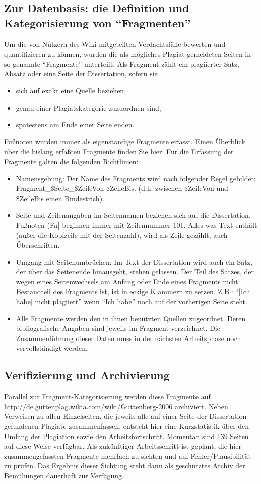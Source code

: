 \documentclass[ngerman,final,fontsize=12pt,paper=a4,twoside,BCOR=8mm,draft=false]{scrartcl}
\begin{document}
\subsection{Zur Datenbasis: die Definition und Kategorisierung von "`Fragmenten"'}
Um die von Nutzern des Wiki mitgeteilten Verdachtsfälle bewerten und quantifizieren zu können, wurden die als mögliches Plagiat gemeldeten Seiten in so genannte "`Fragmente"' unterteilt. Als Fragment zählt ein plagiierter Satz, Absatz oder eine Seite der Dissertation, sofern sie
\begin{itemize}
\item sich auf exakt eine Quelle beziehen,
\item genau einer Plagiatskategorie zuzuordnen sind,
\item spätestens am Ende einer Seite enden.
\end{itemize}
Fußnoten wurden immer als eigenständige Fragmente erfasst. Einen Überblick über die bislang erfaßten Fragmente finden Sie hier. 
Für die Erfassung der Fragmente galten die folgenden Richtlinien: 
\begin{itemize}
\item Namensgebung: Der Name des Fragments wird nach folgender Regel gebildet: Fragment\_\$Seite\_\$ZeileVon-\$ZeileBis. (d.h. zwischen \$ZeileVon und \$ZeileBis einen Bindestrich).
\item Seite und Zeilenangaben im Seitennamen beziehen sich auf die Dissertation. Fußnoten (Fn] beginnen immer mit Zeilennummer 101. Alles was Text enthält (außer die Kopfzeile mit der Seitenzahl), wird als Zeile gezählt, auch Überschriften.
\item Umgang mit Seitenumbrüchen: Im Text der Dissertation wird auch ein Satz, der über das Seitenende hinausgeht, stehen gelassen. Der Teil des Satzes, der wegen eines Seitenwechsels am Anfang oder Ende eines Fragments nicht Bestandteil des Fragments ist, ist in eckige Klammern zu setzen. Z.B.: "`[Ich habe] nicht plagiiert"' wenn "`Ich habe"' noch auf der vorherigen Seite steht.
\item Alle Fragmente werden den in ihnen benutzten Quellen zugeordnet. Deren bibliografische Angaben sind jeweils im Fragment verzeichnet. Die Zusammenführung dieser Daten muss in der nächsten Arbeitsphase noch vervollständigt werden.
\end{itemize}

\subsection{Verifizierung und Archivierung}
Parallel zur Fragment-Kategorisierung werden diese Fragmente auf http://de.guttenplag.wikia.com/wiki/Guttenberg-2006 archiviert. Neben Verweisen zu allen Einzelseiten, die jeweils alle auf einer Seite der Dissertation gefundenen Plagiate zusammenfassen, entsteht hier eine Kurzstatistik über den Umfang der Plagiation sowie den Arbeitsfortschritt. Momentan sind 139 Seiten auf diese Weise verfügbar. 
Als zukünftiger Arbeitsschritt ist geplant, die hier zusammengefassten Fragmente mehrfach zu sichten und auf Fehler/Plausibilität zu prüfen. Das Ergebnis dieser Sichtung steht dann als geschütztes Archiv der Bemühungen dauerhaft zur Verfügung.
\end{document}
